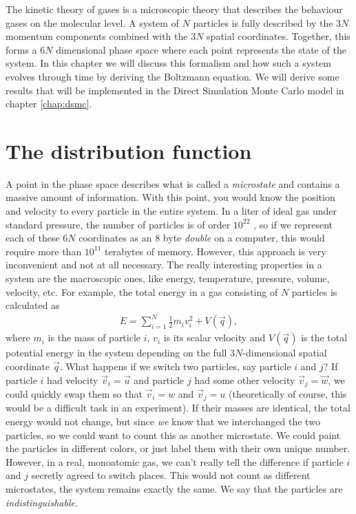 The kinetic theory of gases is a microscopic theory that describes the behaviour gases on the molecular level. A system of $N$ particles is fully described by the $3N$ momentum components combined with the $3N$ spatial coordinates. Together, this forms a $6N$ dimensional phase space where each point represents the state of the system. In this chapter we will discuss this formalism and how such a system evolves through time by deriving the Boltzmann equation. We will derive some results that will be implemented in the Direct Simulation Monte Carlo model in chapter \ref{chap:dsmc}.

\section{The distribution function}
A point in the phase space describes what is called a \textit{microstate} and contains a massive amount of information. With this point, you would know the position and velocity to every particle in the entire system. In a liter of ideal gas under standard pressure, the number of particles is of order $10^{22}$ \cite{garcia2000numerical}, so if we represent each of these $6N$ coordinates as an 8 byte \textit{double} on a computer, this would require more than $10^{11}$ terabytes of memory. However, this approach is very inconvenient and not at all necessary. The really interesting properties in a system are the macroscopic ones, like energy, temperature, pressure, volume, velocity, etc. For example, the total energy in a gas consisting of $N$ particles is calculated as
\begin{align*}
	E = \sum_{i=1}^N \frac{1}{2} m_i v_i^2 + V(\vec q),
\end{align*}
where $m_i$ is the mass of particle $i$, $v_i$ is its scalar velocity and $V(\vec q)$ is the total potential energy in the system depending on the full $3N$-dimensional spatial coordinate $\vec q$. What happens if we switch two particles, say particle $i$ and $j$? If particle $i$ had velocity $\vec v_i = \vec u$ and particle $j$ had some other velocity $\vec v_j = \vec w$, we could quickly swap them so that $\vec v_i = w$ and $\vec v_j = u$ (theoretically of course, this would be a difficult task in an experiment). If their masses are identical, the total energy would not change, but since \textit{we} know that we interchanged the two particles, so we could want to count this as another microstate. We could paint the particles in different colors, or just label them with their own unique number. However, in a real, monoatomic gas, we can't really tell the difference if particle $i$ and $j$ secretly agreed to switch places. This would not count as different microstates, the system remains exactly the same. We say that the particles are \textit{indistinguishable}.\\

